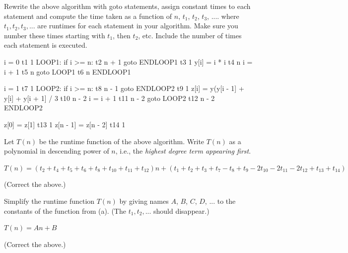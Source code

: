 \nextq
Rewrite the above algorithm with
goto statements, assign constant times to each statement and
compute the time taken as a function of $n$, $t_1$, $t_2$, $t_3$, ....
where $t_1, t_2, t_3, ...$ are runtimes for each statement in your
algorithm. Make sure you
number these times starting with $t_1$, then
$t_2$, etc.
Include the number of times each statement is executed.
\\
\ANSWER
\begin{answercode}
          i = 0                                      t1      1
LOOP1:    if i >= n:                                 t2      n + 1
              goto ENDLOOP1                          t3      1
          y[i] = i * i                               t4      n
          i = i + 1                                  t5      n
          goto LOOP1                                 t6      n
          ENDLOOP1

          i = 1                                      t7      1
LOOP2:    if i >= n:                                 t8      n - 1
               goto ENDLOOP2                         t9      1
          z[i] = y(y[i - 1] + y[i] + y[i + 1] / 3    t10     n - 2
          i = i + 1                                  t11     n - 2
          goto LOOP2                                 t12     n - 2
          ENDLOOP2

          z[0] = z[1]                                t13     1
          z[n - 1] = z[n - 2]                        t14     1
          
\end{answercode}

\nextq
Let $T(n)$ be the runtime function of the above algorithm.
Write $T(n)$ as a polynomial in descending power of $n$, i.e.,
the \textit{highest degree term appearing first}.
\\
\ANSWER
\begin{answerlong}
$T(n) = (t_{2} + t_{4} + t_{5} + t_{6} + t_{8} + t_{10} + t_{11} + t_{12})n + (t_{1} + t_{2} + t_{3} + t_{7} - t_{8} + t_{9} - 2t_{10} - 2t_{11} - 2t_{12} + t_{13} + t_{14})$
\end{answerlong}
(Correct the above.)

\nextq
Simplify the runtime function $T(n)$
by giving names $A$, $B$, $C$, $D$, ...
to the constants of the function from (a). (The $t_1, t_2, ...$ should
disappear.)
\\
\ANSWER
\begin{answerlong}
$T(n) = A n + B$
\end{answerlong}
(Correct the above.)

